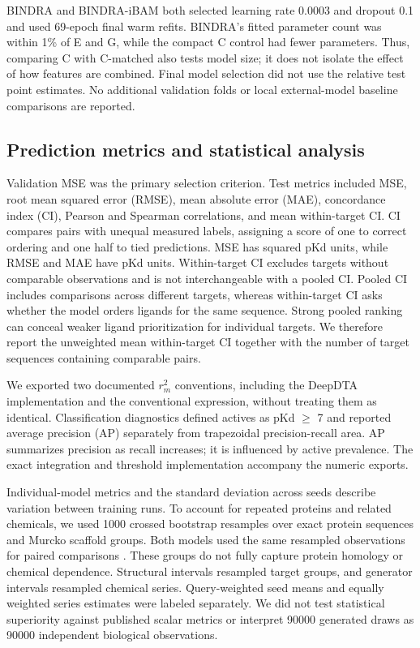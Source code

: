 \documentclass[12pt,a4paper]{article}
\begin{document}
BINDRA and BINDRA-iBAM both selected learning rate 0.0003 and dropout 0.1 and used 69-epoch final warm refits. BINDRA's fitted parameter count was within 1\% of E and G, while the compact C control had fewer parameters. Thus, comparing C with C-matched also tests model size; it does not isolate the effect of how features are combined. Final model selection did not use the relative test point estimates. No additional validation folds or local external-model baseline comparisons are reported.

\subsection*{Prediction metrics and statistical analysis}
Validation MSE was the primary selection criterion. Test metrics included MSE, root mean squared error (RMSE), mean absolute error (MAE), concordance index (CI), Pearson and Spearman correlations, and mean within-target CI. CI compares pairs with unequal measured labels, assigning a score of one to correct ordering and one half to tied predictions. MSE has squared pKd units, while RMSE and MAE have pKd units. Within-target CI excludes targets without comparable observations and is not interchangeable with a pooled CI. Pooled CI includes comparisons across different targets, whereas within-target CI asks whether the model orders ligands for the same sequence. Strong pooled ranking can conceal weaker ligand prioritization for individual targets. We therefore report the unweighted mean within-target CI together with the number of target sequences containing comparable pairs.

We exported two documented \(r_m^2\) conventions, including the DeepDTA implementation and the conventional expression, without treating them as identical. Classification diagnostics defined actives as pKd \(\geq\) 7 and reported average precision (AP) separately from trapezoidal precision-recall area. AP summarizes precision as recall increases; it is influenced by active prevalence. The exact integration and threshold implementation accompany the numeric exports.

Individual-model metrics and the standard deviation across seeds describe variation between training runs. To account for repeated proteins and related chemicals, we used 1000 crossed bootstrap resamples over exact protein sequences and Murcko scaffold groups. Both models used the same resampled observations for paired comparisons \citep{bemis1996}. These groups do not fully capture protein homology or chemical dependence. Structural intervals resampled target groups, and generator intervals resampled chemical series. Query-weighted seed means and equally weighted series estimates were labeled separately. We did not test statistical superiority against published scalar metrics or interpret 90000 generated draws as 90000 independent biological observations.
\end{document}
